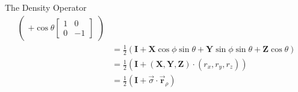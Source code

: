 \documentclass{beamer}
\begin{document}
\begin{frame}{The Density Operator\tiny\cite{rotationsonblochsphere}}
{\begin{align*}
\begin{pmatrix}
                +
                \cos\theta
                \begin{bmatrix}
                  1 & 0 \\
                  0 & -1
                \end{bmatrix}
              \end{pmatrix} \\
            &= \frac{1}2(\mathbf{I} + \mathbf{X}\cos\phi\sin\theta + \mathbf{Y}\sin\phi\sin\theta + \mathbf{Z}\cos\theta) \\
            &= \frac{1}2(\mathbf{I} + (\mathbf{X}, \mathbf{Y}, \mathbf{Z}) \cdot (r_x, r_y, r_z)) \\
            &= \frac{1}2 ( \mathbf{I} + \overrightarrow{\sigma} \cdot \overrightarrow{\mathbf{r}}_{\rho} )
    \end{align*}
  }%
\end{frame}
\end{document}
